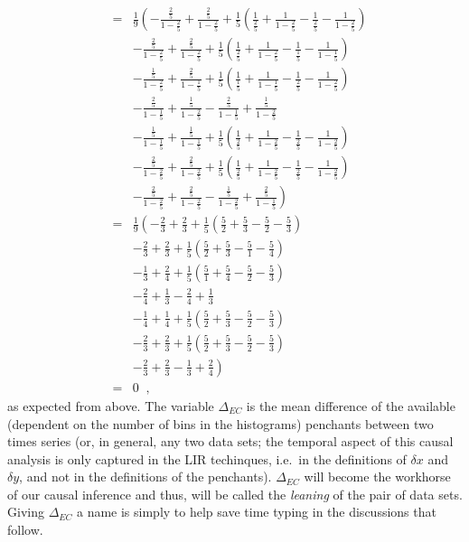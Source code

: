 \documentclass[a4paper,11pt]{article}
\begin{document}
\begin{eqnarray*}
&=& \frac{1}{9}\left(-\frac{\frac{2}{5}}{1-\frac{2}{5}}+\frac{\frac{2}{5}}{1-\frac{2}{5}}+ \frac{1}{5} \left( \frac{1}{\frac{2}{5}}+\frac{1}{1-\frac{2}{5}} - \frac{1}{\frac{2}{5}}-\frac{1}{1-\frac{2}{5}}\right)\right.\\
& &-\frac{\frac{2}{5}}{1-\frac{2}{5}}+\frac{\frac{2}{5}}{1-\frac{2}{5}}+ \frac{1}{5} \left( \frac{1}{\frac{2}{5}}+\frac{1}{1-\frac{2}{5}} - \frac{1}{\frac{1}{5}}-\frac{1}{1-\frac{1}{5}}\right)\\
& &-\frac{\frac{1}{5}}{1-\frac{2}{5}}+\frac{\frac{2}{5}}{1-\frac{1}{5}}+\frac{1}{5} \left( \frac{1}{\frac{1}{5}}+\frac{1}{1-\frac{1}{5}} - \frac{1}{\frac{2}{5}}-\frac{1}{1-\frac{2}{5}}\right)\\
& &-\frac{\frac{2}{5}}{1-\frac{1}{5}}+\frac{\frac{1}{5}}{1-\frac{2}{5}}-\frac{\frac{2}{5}}{1-\frac{1}{5}}+\frac{\frac{1}{5}}{1-\frac{2}{5}}\\
& &-\frac{\frac{1}{5}}{1-\frac{1}{5}}+\frac{\frac{1}{5}}{1-\frac{1}{5}}+\frac{1}{5} \left( \frac{1}{\frac{2}{5}}+\frac{1}{1-\frac{2}{5}} - \frac{1}{\frac{2}{5}}-\frac{1}{1-\frac{2}{5}}\right)\\
& &-\frac{\frac{2}{5}}{1-\frac{2}{5}}+\frac{\frac{2}{5}}{1-\frac{2}{5}}+\frac{1}{5} \left( \frac{1}{\frac{2}{5}}+\frac{1}{1-\frac{2}{5}} - \frac{1}{\frac{2}{5}}-\frac{1}{1-\frac{2}{5}}\right)\\
& &\left.-\frac{\frac{2}{5}}{1-\frac{2}{5}}+\frac{\frac{2}{5}}{1-\frac{2}{5}}-\frac{\frac{1}{5}}{1-\frac{2}{5}}+\frac{\frac{2}{5}}{1-\frac{1}{5}}\right)\\
&=& \frac{1}{9}\left(-\frac{2}{3}+\frac{2}{3}+\frac{1}{5} \left(\frac{5}{2}+\frac{5}{3}-\frac{5}{2}-\frac{5}{3}\right)\right.\\
& &-\frac{2}{3}+\frac{2}{3}+ \frac{1}{5} \left(\frac{5}{2}+\frac{5}{3}-\frac{5}{1}-\frac{5}{4}\right)\\
& &-\frac{1}{3}+\frac{2}{4}+\frac{1}{5} \left(\frac{5}{1}+\frac{5}{4}-\frac{5}{2}-\frac{5}{3}\right)\\
& &-\frac{2}{4}+\frac{1}{3}-\frac{2}{4}+\frac{1}{3}\\
& &-\frac{1}{4}+\frac{1}{4}+\frac{1}{5} \left(\frac{5}{2}+\frac{5}{3}-\frac{5}{2}-\frac{5}{3}\right)\\
& &-\frac{2}{3}+\frac{2}{3}+\frac{1}{5} \left(\frac{5}{2}+\frac{5}{3}-\frac{5}{2}-\frac{5}{3}\right)\\
& &\left.-\frac{2}{3}+\frac{2}{3}-\frac{1}{3}+\frac{2}{4}\right)\\
&=& 0\;\;,
\end{eqnarray*}
as expected from above.  The variable $\Delta_{EC}$ is the mean difference of the available (dependent on the number of bins in the histograms) penchants between two times series (or, in general, any two data sets; the temporal aspect of this causal analysis is only captured in the LIR techinques, i.e.\ in the definitions of $\delta x$ and $\delta y$, and not in the definitions of the penchants).  $\Delta_{EC}$ will become the workhorse of our causal inference and thus, will be called the {\em leaning} of the pair of data sets.  Giving $\Delta_{EC}$ a name is simply to help save time typing in the discussions that follow.
\end{document}
